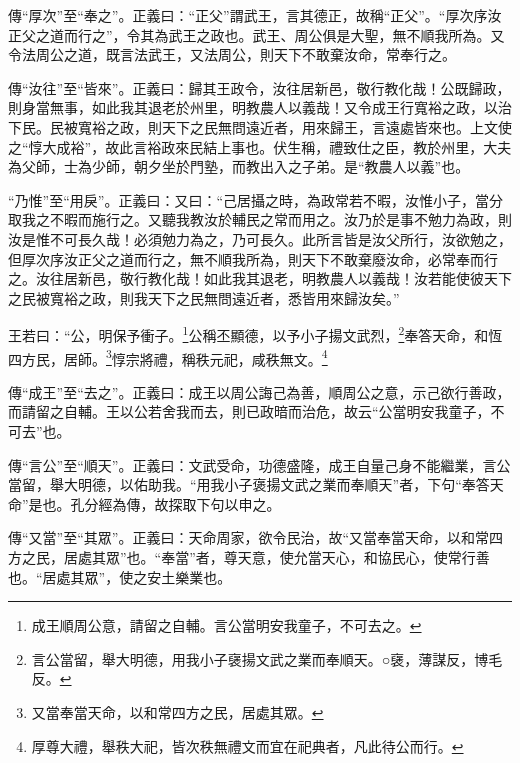 {\noindent\zhuan{}\fzbyks 傳“厚次”至“奉之”。正義曰：“正父”謂武王，言其德正，故稱“正父”。“厚次序汝正父之道而行之”，令其為武王之政也。武王、周公俱是大聖，無不順我所為。又令法周公之道，既言法武王，又法周公，則天下不敢棄汝命，常奉行之。 \par}

{\noindent\zhuan{}\fzbyks 傳“汝往”至“皆來”。正義曰：歸其王政令，汝往居新邑，敬行教化哉！公既歸政，則身當無事，如此我其退老於州里，明教農人以義哉！又令成王行寬裕之政，以治下民。民被寬裕之政，則天下之民無問遠近者，用來歸王，言遠處皆來也。上文使之“惇大成裕”，故此言裕政來民結上事也。伏生稱，禮致仕之臣，教於州里，大夫為父師，士為少師，朝夕坐於門塾，而教出入之子弟。是“教農人以義”也。 \par}

{\noindent\shu{}\fzkt “乃惟”至“用戾”。正義曰：又曰：“己居攝之時，為政常若不暇，汝惟小子，當分取我之不暇而施行之。又聽我教汝於輔民之常而用之。汝乃於是事不勉力為政，則汝是惟不可長久哉！必須勉力為之，乃可長久。此所言皆是汝父所行，汝欲勉之，但厚次序汝正父之道而行之，無不順我所為，則天下不敢棄廢汝命，必常奉而行之。汝往居新邑，敬行教化哉！如此我其退老，明教農人以義哉！汝若能使彼天下之民被寬裕之政，則我天下之民無問遠近者，悉皆用來歸汝矣。” \par}

王若曰：“公，明保予衝子。\footnote{成王順周公意，請留之自輔。言公當明安我童子，不可去之。}公稱丕顯德，以予小子揚文武烈，\footnote{言公當留，舉大明德，用我小子襃揚文武之業而奉順天。○襃，薄謀反，博毛反。}奉答天命，和恆四方民，居師。\footnote{又當奉當天命，以和常四方之民，居處其眾。}惇宗將禮，稱秩元祀，咸秩無文。\footnote{厚尊大禮，舉秩大祀，皆次秩無禮文而宜在祀典者，凡此待公而行。}


{\noindent\zhuan{}\fzbyks 傳“成王”至“去之”。正義曰：成王以周公誨己為善，順周公之意，示己欲行善政，而請留之自輔。王以公若舍我而去，則已政暗而治危，故云“公當明安我童子，不可去”也。 \par}

{\noindent\zhuan{}\fzbyks 傳“言公”至“順天”。正義曰：文武受命，功德盛隆，成王自量己身不能繼業，言公當留，舉大明德，以佑助我。“用我小子褒揚文武之業而奉順天”者，下句“奉答天命”是也。孔分經為傳，故探取下句以申之。 \par}

{\noindent\zhuan{}\fzbyks 傳“又當”至“其眾”。正義曰：天命周家，欲令民治，故“又當奉當天命，以和常四方之民，居處其眾”也。“奉當”者，尊天意，使允當天心，和協民心，使常行善也。“居處其眾”，使之安土樂業也。 \par}

